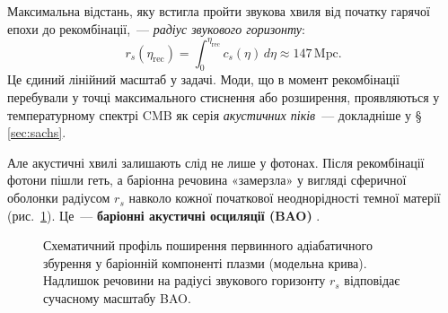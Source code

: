 \documentclass[12pt, a4paper]{article}
\begin{document}
Максимальна відстань, яку встигла пройти звукова хвиля
від початку гарячої епохи до рекомбінації,~---
\emph{радіус звукового горизонту}:
\begin{equation}\label{eq:sound_horizon}
  r_s(\eta_\mathrm{rec})
    = \int_0^{\eta_\mathrm{rec}} c_s(\eta)\,d\eta
    \approx 147\,\mathrm{Mpc}.
\end{equation}
Це єдиний лінійний масштаб у задачі. Моди, що в момент
рекомбінації перебували у точці максимального стиснення
або розширення, проявляються у температурному спектрі
CMB як серія \emph{акустичних піків}~--- докладніше
у §\,\ref{sec:sachs}.

Але акустичні хвилі залишають слід не лише у фотонах.
Після рекомбінації фотони пішли геть, а баріонна речовина
«замерзла» у вигляді сферичної оболонки радіусом $r_s$
навколо кожної початкової неоднорідності темної матерії
(рис.~\ref{fig:bao_profile}). Це~--- \textbf{баріонні
акустичні осциляції (BAO)} \cite{eisenstein_2005}.

\begin{figure}[b!]
\centering
{}
\caption{Схематичний профіль поширення первинного
  адіабатичного збурення у баріонній компоненті плазми
  (модельна крива). Надлишок речовини на радіусі
  звукового горизонту $r_s$ відповідає сучасному
  масштабу BAO.}
\label{fig:bao_profile}
\end{figure}
\end{document}
